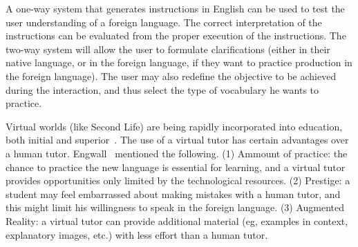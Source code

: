 A one-way system that generates instructions in English can be used to test the
user understanding of a foreign language. The correct interpretation of the
instructions can be evaluated from the proper execution of the instructions. The
two-way system will allow the user to formulate clarifications (either in their
native language, or in the foreign language, if they want to practice
production in the foreign language). The user may also redefine the
objective to be achieved during the interaction, and thus select the type of
vocabulary he wants to practice.


Virtual worlds (like Second Life) are being rapidly incorporated into
education, both initial and superior~\cite{Doswell05,molk:lear09}. The use of a
virtual tutor has certain advantages over a human tutor.
Engwall~ mentioned the following. (1) Ammount of
practice: the chance to practice the new language is essential for learning, and
a virtual tutor provides opportunities only limited by the
technological resources. (2) Prestige: a student
may feel embarrassed about making mistakes with a human tutor, and this
might limit his willingness to speak in the foreign language. (3) Augmented
Reality: a virtual
tutor can provide additional material (eg, examples in context, explanatory
images, etc.) with less effort than a human tutor.

